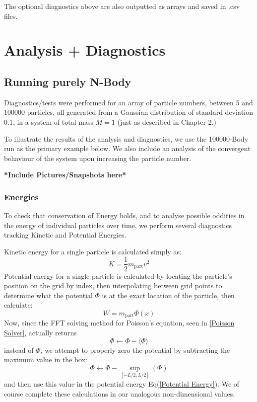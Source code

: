 \documentclass[oneside]{book}
\begin{document}
The optional diagnostics above are also outputted as arrays and saved in .csv files.

\chapter{Analysis + Diagnostics}

\section{Running purely N-Body}
Diagnostics/tests were performed for an array of particle numbers, between 5 and 100000 particles, all generated from a Gaussian distribution of standard deviation 0.1, in a system of total mass $M=1$ (just as described in Chapter 2.)

To illustrate the results of the analysis and diagnostics,  we use the 100000-Body run as the primary example below. We also include an analysis of the convergent behaviour of the system upon increasing the particle number.

{\color{red}\textbf{*Include Pictures/Snapshots here*}}

\subsection{Energies}
To check that conservation of Energy holds, and to analyse possible oddities in the energy of individual particles over time, we perform several diagnostics tracking Kinetic and Potential Energies.

Kinetic energy for a single particle is calculated simply as:
\begin{equation}
    K = \frac{1}{2}m_\text{part} v^2
\end{equation}
Potential energy for a single particle is calculated by locating the particle's position on the grid by index, then interpolating between grid points to determine what the potential $\Phi$ is at the exact location of the particle, then calculate:
\begin{equation}
    W = m_\text{part}\Phi(x)    
    \label{Potential Energy}
\end{equation}
Now, since the FFT solving method for Poisson's equation, seen in \cref{Poisson Solver}, actually returns
$$\Phi \leftarrow \Phi - \langle\Phi\rangle$$
instead of $\Phi$, we attempt to properly zero the potential by subtracting the maximum value in the box:
$$\Phi \leftarrow \Phi - \sup_{[-L/2,L/2]}(\Phi)$$
and then use this value in the potential energy Eq(\ref{Potential Energy}). We of course complete these calculations in our analogous non-dimensional values.
\end{document}
